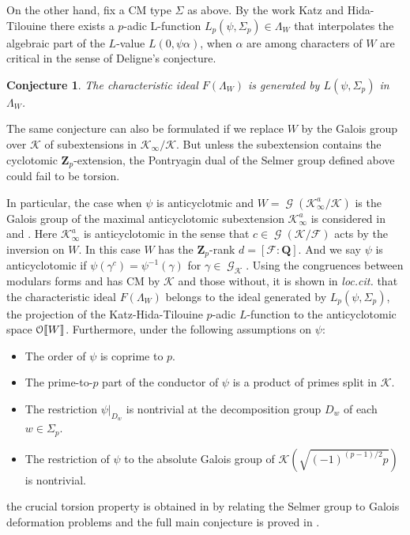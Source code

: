 \documentclass[leqno]{amsart}
\newtheorem{conj}[thm]{Conjecture}
\theoremstyle{definition}
\theoremstyle{remark}
\newcommand{\eo}{\EuScript{O}}
\newcommand{\Q}{{\mathbf{Q}}}
\newcommand{\Zp}{\mathbf{Z}_p}
\DeclareMathOperator{\Gal}{\mathcal{G}}
\newcommand{\F}{{\mathcal{F}}} %
\newcommand{\K}{{\mathcal{K}}} %
\begin{document}
On the other hand, fix a CM type $\Sigma$ as above.
By the work Katz \cite{Katz1978} 
and Hida-Tilouine \cite{HT93} there exists 
a $p$-adic L-function
$L_p(\psi,\Sigma_p)\in \Lambda_W$ 
that interpolates the algebraic part
of the $L$-value $L(0,\psi\alpha)$,
when $\alpha$ are among characters of $W$
are critical in the sense of Deligne's conjecture.

\begin{conj}
The characteristic ideal $F(\Lambda_W)$
is generated by $L(\psi,\Sigma_p)$ in $\Lambda_W$.
\end{conj}


The same conjecture can also be formulated if we replace
$W$ by the Galois group over $\K$
of subextensions in $\K_\infty/\K$.
But unless the subextension contains the 
cyclotomic $\Zp$-extension,
the Pontryagin dual of the Selmer group defined above
could fail to be torsion.

In particular, the case when 
$\psi$ is anticyclotmic and
$W=\Gal(\K_\infty^a/\K)$ is the Galois group of the maximal 
anticyclotomic subextension $\K_\infty^a$ is considered
in \cite{HT93} and \cite{HT94}.
Here $\K_\infty^a$ is anticyclotomic in the sense that 
$c\in\Gal(\K/\F)$ acts by the inversion on $W$.
In this case $W$ has the $\Zp$-rank $d=[\F:\Q]$.
And we say $\psi$ is anticyclotomic if 
$\psi(\gamma^c)=\psi^{-1}(\gamma)$ for $\gamma\in\Gal_\K$.
Using the congruences between modulars forms
and has CM by $\K$ and those without,
it is shown in \textit{loc.cit.}
that the characteristic ideal $F(\Lambda_W)$
belongs to the ideal generated by $L_p(\psi,\Sigma_p)$,
the projection of the Katz-Hida-Tilouine $p$-adic $L$-function
to the anticyclotomic space $\eo\llbracket W\rrbracket$.
Furthermore, under the following  assumptions on $\psi$:
\begin{itemize}
    \item The order of $\psi$ is coprime to $p$.
    \item The prime-to-$p$ part of the conductor of $\psi$
    is a product of primes split in $\K$.
    \item The restriction $\psi\vert_{D_w}$ is nontrivial
    at the decomposition group $D_w$ of each $w\in\Sigma_p$.
    \item The restriction of $\psi$ to 
    the absolute Galois group of $\K(\sqrt{(-1)^{(p-1)/2}p})$
    is nontrivial.
\end{itemize}
the crucial torsion property is obtained in
\cite[Thm.5.33]{Hida06b} by relating the Selmer group to 
Galois deformation problems
and the full main conjecture 
is proved in \cite{Hida06}.
\end{document}
